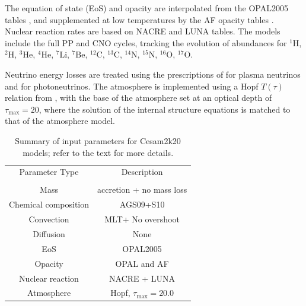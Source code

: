 \documentclass[12pt,a4paper]{article}
\newcommand{\mr}{\mathrm}
\begin{document}
The equation of state (EoS) and opacity are interpolated from the OPAL2005 tables \parencite{RogersIglesias1992,IglesiasRogers1996,RogersNayfonov2002}, and supplemented at low temperatures by the AF opacity tables \parencite{FergusonEtAl2005}. Nuclear reaction rates are based on NACRE \parencite{AikawaEtAl2006} and LUNA \parencite{BrogginiEtAl2018} tables. The models include the full PP and CNO cycles, tracking the evolution of abundances for $^{1}\mr{H}$, $^{2}\mr{H}$, $^{3}\mr{He}$, $^{4}\mr{He}$, $^{7}\mr{Li}$, $^{7}\mr{Be}$, $^{12}\mr{C}$, $^{13}\mr{C}$, $^{14}\mr{N}$, $^{15}\mr{N}$, $^{16}\mr{O}$, $^{17}\mr{O}$.

Neutrino energy losses are treated using the prescriptions of \textcite{HaftEtAl1994} for plasma neutrinos and \textcite{Weigert1966} for photoneutrinos. The atmosphere is implemented using a Hopf $T(\tau)$ relation from \textcite{HubenyMihalas2015}, with the base of the atmosphere set at an optical depth of $\tau_{\max} = 20$, where the solution of the internal structure equations is matched to that of the atmosphere model.

\begin{table}
    \hfill
    \begin{tabularx}{.8\textwidth}{|| c | c ||}
        \cline{1-2}
        Parameter Type & Description \\ \cline{1-2}\\[-1em]\cline{1-2}
        Mass & accretion + no mass loss\\ \cline{1-2}
        Chemical composition  & AGS09+S10\footnotemark[1]\\ \cline{1-2}
        Convection & MLT\footnotemark[2] + No overshoot\\ \cline{1-2}
        Diffusion & None \\ \cline{1-2}
        EoS & OPAL2005\footnotemark[3] \\ \cline{1-2}
        Opacity & OPAL and AF \footnotemark[4]\\ \cline{1-2}
        Nuclear reaction & NACRE + LUNA\footnotemark[5]\\ \cline{1-2}
        Atmosphere & Hopf\footnotemark[6], $\tau_{\max} = 20.0$\\ \cline{1-2}
    \end{tabularx}
    \caption{Summary of input parameters for Cesam2k20 models; refer to the text for more details.} \label{tab:input_physics}
    \hfill
\end{table}
\end{document}
